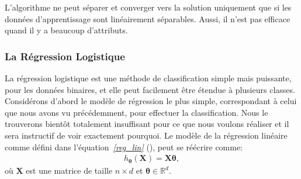 \documentclass[letterpaper,11pt,english]{sphinxmanual}
\begin{document}
\sphinxAtStartPar
L’algorithme ne peut séparer et converger vers la solution uniquement
que si les données d’apprentissage sont linéairement séparables. Aussi,
il n’est pas efficace quand il y a beaucoup d’attributs.


\subsubsection{La Régression Logistique}
\label{\detokenize{chapter3:la-regression-logistique}}
\sphinxAtStartPar
La régression logistique est une méthode de classification simple mais
puissante, pour les données binaires, et elle peut facilement être
étendue à plusieurs classes. Considérons d’abord le modèle de régression
le plus simple, correspondant à celui que nous avons vu précédemment,
pour effectuer la classification. Nous le trouverons bientôt totalement
insuffisant pour ce que nous voulons réaliser et il sera instructif de
voir exactement pourquoi. Le modèle de la régression linéaire comme
défini dans l’équation {\hyperref[\detokenize{chapter3:reg_lin}]{\emph{{[}reg\_lin{]}}}} (), peut se réécrire comme:
\begin{equation}\label{equation:chapter3:chapter3:27}
\begin{split}h_{\boldsymbol{\theta}}(\mathbf{X})=  \mathbf{X}\boldsymbol{\theta},\end{split}
\end{equation}
\sphinxAtStartPar
où \(\mathbf{X}\) est une matrice de taille \(n\times d\) et
\(\boldsymbol{\theta} \in \mathbb{R}^{d}\).
\end{document}
